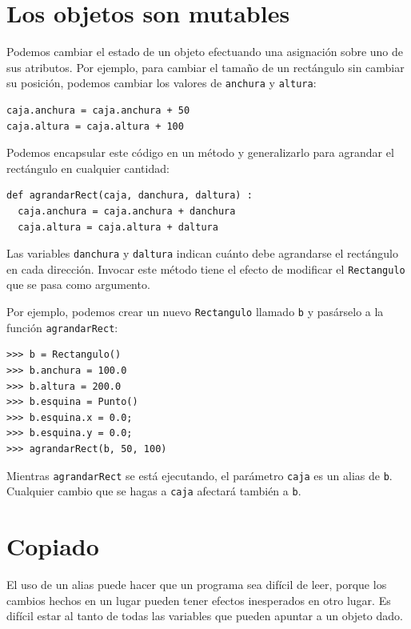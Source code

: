 \section{Los objetos son mutables}

Podemos cambiar el estado de un objeto efectuando una asignación
sobre uno de sus atributos. Por ejemplo, para cambiar el tamaño de
un rectángulo sin cambiar su posición, podemos cambiar los valores de
\texttt{anchura} y \texttt{altura}:

\beforeverb
\begin{verbatim}
caja.anchura = caja.anchura + 50
caja.altura = caja.altura + 100
\end{verbatim}
\afterverb
%
Podemos encapsular este código en un método y generalizarlo
para agrandar el rectángulo en cualquier cantidad:


\beforeverb
\begin{verbatim}
def agrandarRect(caja, danchura, daltura) :
  caja.anchura = caja.anchura + danchura
  caja.altura = caja.altura + daltura
\end{verbatim}
\afterverb
%
Las variables \texttt{danchura} y \texttt{daltura} indican cuánto debe agrandarse
el rectángulo en cada dirección. Invocar este método tiene el efecto de
modificar el \texttt{Rectangulo} que se pasa como argumento.

Por ejemplo, podemos crear un nuevo \texttt{Rectangulo} llamado \texttt{b}
y pasárselo a la función \texttt{agrandarRect}:

\beforeverb
\begin{verbatim}
>>> b = Rectangulo()
>>> b.anchura = 100.0
>>> b.altura = 200.0
>>> b.esquina = Punto()
>>> b.esquina.x = 0.0;
>>> b.esquina.y = 0.0;
>>> agrandarRect(b, 50, 100)
\end{verbatim}
\afterverb
%
Mientras \texttt{agrandarRect} se está ejecutando, el parámetro \texttt{caja} es un
alias de \texttt{b}. Cualquier cambio que se hagas a \texttt{caja} afectará también a
\texttt{b}.


\section{Copiado}

El uso de un alias puede hacer que un programa sea difícil de leer,
porque los cambios hechos en un lugar pueden tener efectos inesperados
en otro lugar. Es difícil estar al tanto de todas las variables que 
pueden apuntar a un objeto dado.

